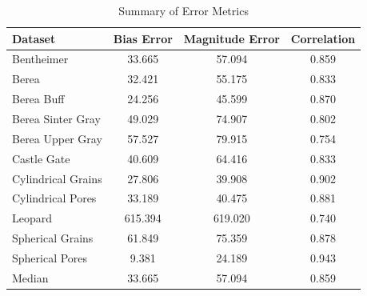 \begin{table}[h!]
    \centering
    \caption{Summary of Error Metrics}
    \label{tab:metrics_summary}
\begin{tabular}{lccc}
\toprule
Dataset & Bias Error & Magnitude Error & Correlation \\
\midrule
Bentheimer & 33.665 & 57.094 & 0.859 \\
Berea & 32.421 & 55.175 & 0.833 \\
Berea Buff & 24.256 & 45.599 & 0.870 \\
Berea Sinter Gray & 49.029 & 74.907 & 0.802 \\
Berea Upper Gray & 57.527 & 79.915 & 0.754 \\
Castle Gate & 40.609 & 64.416 & 0.833 \\
Cylindrical Grains & 27.806 & 39.908 & 0.902 \\
Cylindrical Pores & 33.189 & 40.475 & 0.881 \\
Leopard & 615.394 & 619.020 & 0.740 \\
Spherical Grains & 61.849 & 75.359 & 0.878 \\
Spherical Pores & 9.381 & 24.189 & 0.943 \\
\hline
Median & 33.665 & 57.094 & 0.859 \\
\bottomrule
\end{tabular}
\end{table}
